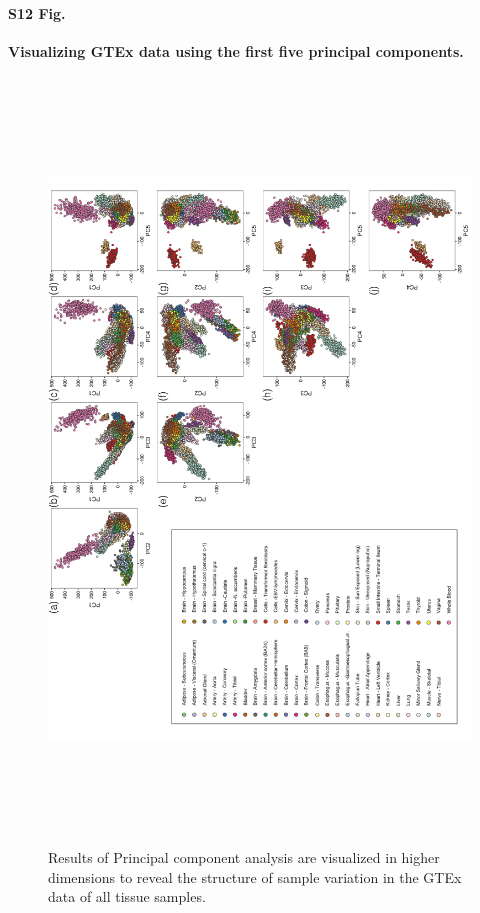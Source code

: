 \documentclass[10pt,letterpaper]{article}
\begin{document}
\paragraph*{S12 Fig.}

\label{figS12}
{\bf Visualizing GTEx data using the first five principal components.}
\begin{figure}[ht]
\centering
\includegraphics[height=8in, width=6in]{../../src/figure/gtex-high-pcs.Rmd/gtex-high-pcs.jpeg}
\caption{Results of Principal component analysis are visualized in higher dimensions to reveal the structure of sample variation in the GTEx data of all tissue samples.}
\end{figure}
\end{document}
